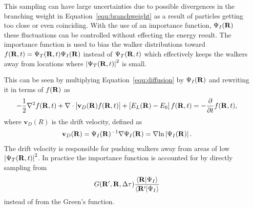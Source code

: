 This sampling can have large uncertainties due to possible divergences in the branching weight in Equation~\ref{equ:branchweight} as a result of particles getting too close or even coinciding. With the use of an importance function, $\Psi_I(\mathbf{R})$ these fluctuations can be controlled without effecting the energy result. The importance function is used to bias the walker distributions toward $f(\mathbf{R},t) = \Psi_T(\mathbf{R},t)\Psi_I(\mathbf{R})$ instead of $\Psi_T(\mathbf{R},t)$ which effectively keeps the walkers away from locations where $\left|\Psi_T(\mathbf{R},t)\right|^2$ is small.

This can be seen by multiplying Equation~\ref{equ:diffusion} by $\Psi_I(\mathbf{R})$ and rewriting it in terms of $f(\mathbf{R})$ as
\begin{equation}
   -\frac{1}{2}\nabla^2 f(\mathbf{R},t) + \nabla\cdot\left[\mathbf{v}_D(\mathbf{R}) f(\mathbf{R},t)\right] + \left[E_L(\mathbf{R})-E_0\right]f(\mathbf{R},t) = -\frac{\partial}{\partial t} f(\mathbf{R},t),
\end{equation}
where $\mathbf{v}_D(R)$ is the drift velocity, defined as
\begin{equation}
   \mathbf{v}_D(\mathbf{R}) = \Psi_I(\mathbf{R})^{-1}\nabla\Psi_I(\mathbf{R}) = \nabla \text{ln}\left|\Psi_I(\mathbf{R})\right|.
\end{equation}
The drift velocity is responsible for pushing walkers away from areas of low $\left|\Psi_T(\mathbf{R},t)\right|^2$. In practice the importance function is accounted for by directly sampling from
\begin{equation}
   G(\mathbf{R}',\mathbf{R},\Delta\tau)\frac{\left< \mathbf{R} | \Psi_I \right>}{\left< \mathbf{R}' | \Psi_I \right>}
\end{equation}
instead of from the Green's function.

